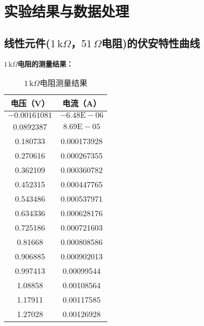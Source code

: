 \documentclass[UTF8]{article}
\theoremstyle{MyLineTheoremStyle} %
\theoremstyle{MyBlockTheoremStyle} %
\theoremstyle{MySubsubsectionStyle} %
\begin{document}
\section{实验结果与数据处理}
\subsection{线性元件($ 1\,\mathrm k\Omega $，$ 51\,\Omega $电阻)的伏安特性曲线}
\textbf{$ 1\,\mathrm k\Omega $电阻的测量结果：}
\begin{table}[H]
    \centering
    \begin{tabular}{|c|c|}
        \hline
        电压（V） & 电流（A）\\
        \hline
        $ -0.00161081 $ & $ -6.48\mathrm E-06 $\\
        \hline
        0.0892387 & $ 8.69\mathrm E-05 $\\
        \hline
        0.180733 & 0.000173928\\
        \hline
        0.270616 & 0.000267355\\
        \hline
        0.362109 & 0.000360782\\
        \hline
        0.452315 & 0.000447765\\
        \hline
        0.543486 & 0.000537971\\
        \hline
        0.634336 & 0.000628176\\
        \hline
        0.725186 & 0.000721603\\
        \hline
        0.81668 & 0.000808586\\
        \hline
        0.906885 & 0.000902013\\
        \hline
        0.997413 & 0.00099544\\
        \hline
        1.08858 & 0.00108564\\
        \hline
        1.17911 & 0.00117585\\
        \hline
        1.27028 & 0.00126928\\
        \hline
    \end{tabular}
    \caption{\small $ 1\,\mathrm k\Omega $电阻测量结果}
\end{table}

\end{document}
